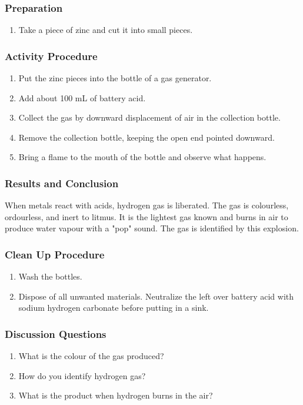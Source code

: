 \subsubsection*{Preparation}
\begin{enumerate}
\item{Take a piece of zinc and cut it into small pieces.}
\end{enumerate}

\subsubsection*{Activity Procedure}
\begin{enumerate}
\item{Put the zinc pieces into the bottle of a gas generator.}
\item{Add about 100 mL of battery acid.}
\item{Collect the gas by downward displacement of air in the collection bottle.}
\item{Remove the collection bottle, keeping the open end pointed downward.}
\item{Bring a flame to the mouth of the bottle and observe what happens.}
\end{enumerate}

\subsubsection*{Results and Conclusion}
When metals react with acids, hydrogen gas is liberated. The gas is colourless, ordourless, and inert to litmus. It is the lightest gas known and burns in air to produce water vapour with a "pop" sound. The gas is identified by this explosion.

\subsubsection*{Clean Up Procedure}
\begin{enumerate}
\item{Wash the bottles.}
\item{Dispose of all unwanted materials. Neutralize the left over battery acid with sodium hydrogen carbonate before putting in a sink.}
\end{enumerate}

\subsubsection*{Discussion Questions}
\begin{enumerate}
\item{What is the colour of the gas produced?}
\item{How do you identify hydrogen gas?}
\item{What is the product when hydrogen burns in the air?}
\end{enumerate}

